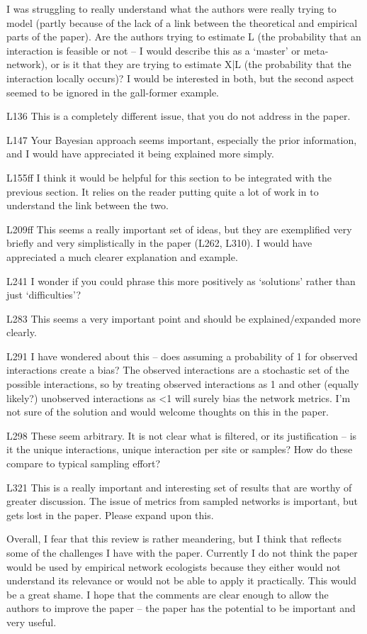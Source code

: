 \documentclass[12pt]{letter}
\begin{document}
I was struggling to really understand what the authors were really trying to model (partly because of the lack of a link between the theoretical and empirical parts of the paper). Are the authors trying to estimate L (the probability that an interaction is feasible or not – I would describe this as a ‘master’ or meta- network), or is it that they are trying to estimate X|L (the probability that the interaction locally occurs)? I would be interested in both, but the second aspect seemed to be ignored in the gall-former example.

L136 This is a completely different issue, that you do not address in the paper.

L147 Your Bayesian approach seems important, especially the prior information, and I would have appreciated it being explained more simply.

L155ff I think it would be helpful for this section to be integrated with the previous section. It relies on the reader putting quite a lot of work in to understand the link between the two.

L209ff This seems a really important set of ideas, but they are exemplified very briefly and very simplistically in the paper (L262, L310). I would have appreciated a much clearer explanation and example.

L241 I wonder if you could phrase this more positively as ‘solutions’ rather than just ‘difficulties’?

L283 This seems a very important point and should be explained/expanded more clearly.

L291 I have wondered about this – does assuming a probability of 1 for observed interactions create a bias? The observed interactions are a stochastic set of the possible interactions, so by treating observed interactions as 1 and other (equally likely?) unobserved interactions as <1 will surely bias the network metrics. I’m not sure of the solution and would welcome thoughts on this in the paper.

L298 These seem arbitrary. It is not clear what is filtered, or its justification – is it the unique interactions, unique interaction per site or samples? How do these compare to typical sampling effort?

L321 This is a really important and interesting set of results that are worthy of greater discussion. The issue of metrics from sampled networks is important, but gets lost in the paper. Please expand upon this.

Overall, I fear that this review is rather meandering, but I think that reflects some of the challenges I have with the paper. Currently I do not think the paper would be used by empirical network ecologists because they either would not understand its relevance or would not be able to apply it practically. This would be a great shame. I hope that the comments are clear enough to allow the authors to improve the paper – the paper has the potential to be important and very useful.
\end{document}
